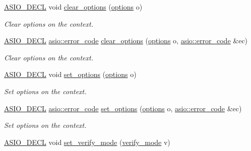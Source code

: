 \begin{DoxyCompactItemize}
\item 
\hyperlink{config_8hpp_ab54d01ea04afeb9a8b39cfac467656b7}{A\+S\+I\+O\+\_\+\+D\+E\+C\+L} void \hyperlink{classasio_1_1ssl_1_1context_a62e708e23b6751fbf628ae536246fa51}{clear\+\_\+options} (\hyperlink{classasio_1_1ssl_1_1context__base_a12d5d28abeb47c91311bf13740dec514}{options} o)
\begin{DoxyCompactList}\small\item\em Clear options on the context. \end{DoxyCompactList}\item 
\hyperlink{config_8hpp_ab54d01ea04afeb9a8b39cfac467656b7}{A\+S\+I\+O\+\_\+\+D\+E\+C\+L} \hyperlink{classasio_1_1error__code}{asio\+::error\+\_\+code} \hyperlink{classasio_1_1ssl_1_1context_a907edce02c900f89e9a97e4724349e24}{clear\+\_\+options} (\hyperlink{classasio_1_1ssl_1_1context__base_a12d5d28abeb47c91311bf13740dec514}{options} o, \hyperlink{classasio_1_1error__code}{asio\+::error\+\_\+code} \&ec)
\begin{DoxyCompactList}\small\item\em Clear options on the context. \end{DoxyCompactList}\item 
\hyperlink{config_8hpp_ab54d01ea04afeb9a8b39cfac467656b7}{A\+S\+I\+O\+\_\+\+D\+E\+C\+L} void \hyperlink{classasio_1_1ssl_1_1context_a6f13217c890da8142f578aaedf4cf23e}{set\+\_\+options} (\hyperlink{classasio_1_1ssl_1_1context__base_a12d5d28abeb47c91311bf13740dec514}{options} o)
\begin{DoxyCompactList}\small\item\em Set options on the context. \end{DoxyCompactList}\item 
\hyperlink{config_8hpp_ab54d01ea04afeb9a8b39cfac467656b7}{A\+S\+I\+O\+\_\+\+D\+E\+C\+L} \hyperlink{classasio_1_1error__code}{asio\+::error\+\_\+code} \hyperlink{classasio_1_1ssl_1_1context_a048f8e39c5e19d28e05f9037c7d4da59}{set\+\_\+options} (\hyperlink{classasio_1_1ssl_1_1context__base_a12d5d28abeb47c91311bf13740dec514}{options} o, \hyperlink{classasio_1_1error__code}{asio\+::error\+\_\+code} \&ec)
\begin{DoxyCompactList}\small\item\em Set options on the context. \end{DoxyCompactList}\item 
\hyperlink{config_8hpp_ab54d01ea04afeb9a8b39cfac467656b7}{A\+S\+I\+O\+\_\+\+D\+E\+C\+L} void \hyperlink{classasio_1_1ssl_1_1context_a20d511ef9cfeb079b8845fdacc7d908e}{set\+\_\+verify\+\_\+mode} (\hyperlink{classasio_1_1ssl_1_1context__base_aa9ef38ba747dd4e8ecb1f9a279a67d6b}{verify\+\_\+mode} v)

\end{DoxyCompactItemize}
